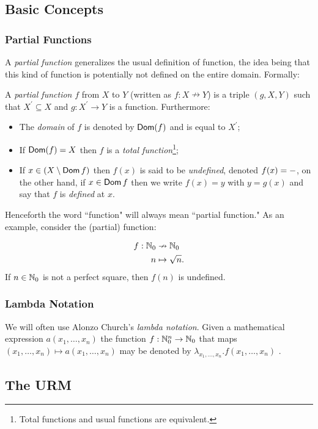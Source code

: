 \subsection{Basic Concepts}
\subsubsection*{Partial Functions}
A \emph{partial function} generalizes the usual definition of function, the idea being that this kind of function is potentially not defined on the entire domain. Formally:
\begin{definition}
	A \emph{partial function} $f$ from $X$ to $Y$ (written as $f : X \nrightarrow Y$)  is a triple $(g,X,Y)$ such that $X^\prime \subseteq X$ and $g:X^\prime \to Y$ is a function. Furthermore:
	\begin{itemize}
	 \item 
		The \emph{domain} of $f$ is denoted by $\operatorname{\mathsf{Dom}}(f)$ and is equal to $X^\prime$; 
	 \item
		 If $ \operatorname{\mathsf{Dom}}(f) = X$ then $f$ is a \emph{total function}\footnote{Total functions and usual functions are equivalent.};
	 \item
		 If $x \in (X \setminus \operatorname{\mathsf{Dom}} f)$ then $f(x)$ is said to be \emph{undefined}, denoted $f(x) = \--$, on the other hand, if $x \in \operatorname{\mathsf{Dom}} f$ then we write $f(x) = y$ with $y = g(x)$ and say that $f$ is \emph{defined} at $x$.  
 \end{itemize}
\end{definition}
Henceforth the word ``function" will always mean ``partial function."  As an example, consider the (partial) function:

\begin{align*}
	f : \mathbb{N}_0  & \nrightarrow  \mathbb{N}_0 \\
		n  & \mapsto       \sqrt n.
\end{align*}
If $n \in \mathbb{N}_0$ is not a perfect square, then $f(n)$ is undefined. 

\subsubsection*{Lambda Notation}
We will often use Alonzo Church's \emph{lambda notation}. Given a mathematical expression $a(x_1, \ldots, x_n)$ the function $f: \mathbb{N}_0^n \to \mathbb{N}_0$ that maps $(x_1, \ldots, x_n) \mapsto a(x_1, \ldots, x_n)$ may be denoted by $\lambda_{x_1, \ldots, x_n}.f(x_1, \ldots, x_n)$ .
\subsection{The URM}
